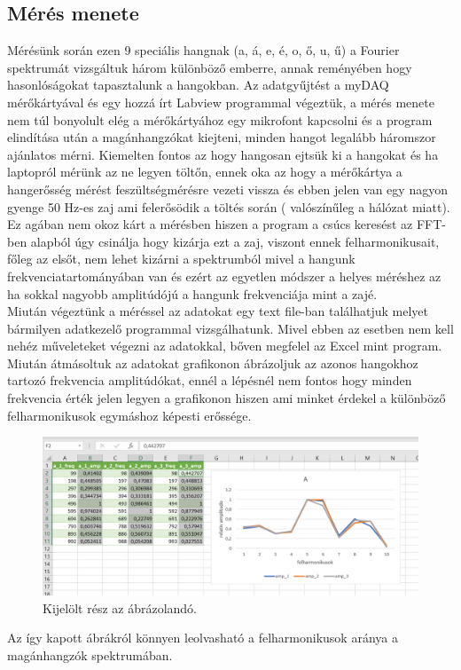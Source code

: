\documentclass[a4paper,12pt]{article}
\begin{document}
\subsection{Mérés menete}
Mérésünk során ezen 9 speciális hangnak (a, á, e, é, o, ő, u, ű) a Fourier spektrumát vizsgáltuk három különböző emberre, annak reményében hogy hasonlóságokat tapasztalunk a hangokban. Az adatgyűjtést a myDAQ mérőkártyával és egy hozzá írt Labview programmal végeztük, a mérés menete nem túl bonyolult elég a mérőkártyához egy mikrofont kapcsolni és a program elindítása után a magánhangzókat kiejteni, minden hangot legalább háromszor ajánlatos mérni. Kiemelten fontos az hogy hangosan ejtsük ki a hangokat és ha laptopról mérünk az ne legyen töltőn, ennek oka az hogy a mérőkártya a hangerősség mérést feszültségmérésre vezeti vissza és ebben jelen van egy nagyon gyenge 50 Hz-es zaj ami felerősödik a töltés során ( valószínűleg a hálózat miatt). Ez agában nem okoz kárt a mérésben hiszen a program a csúcs keresést az FFT-ben alapból úgy csinálja hogy kizárja ezt a zaj, viszont ennek felharmonikusait, főleg az elsőt, nem lehet kizárni a spektrumból mivel a hangunk frekvenciatartományában van és ezért az egyetlen módszer a helyes méréshez az ha sokkal nagyobb amplitúdójú a hangunk frekvenciája mint a zajé.\\
Miután végeztünk a méréssel az adatokat egy text file-ban találhatjuk melyet bármilyen adatkezelő programmal vizsgálhatunk. Mivel ebben az esetben nem kell nehéz műveleteket végezni az adatokkal, bőven megfelel az Excel mint program. Miután átmásoltuk az adatokat grafikonon ábrázoljuk az azonos hangokhoz tartozó frekvencia amplitúdókat, ennél a lépésnél nem fontos hogy minden frekvencia érték jelen legyen a grafikonon hiszen ami minket érdekel a különböző felharmonikusok egymáshoz képesti erőssége. 
\begin{figure}[h]
\centering
\includegraphics[width=\textwidth]{minta.png}
\caption{Kijelölt rész az ábrázolandó.}
\label{1ábra}
\end{figure} 
Az így kapott ábrákról könnyen leolvasható a felharmonikusok aránya a magánhangzók spektrumában.
\end{document}
